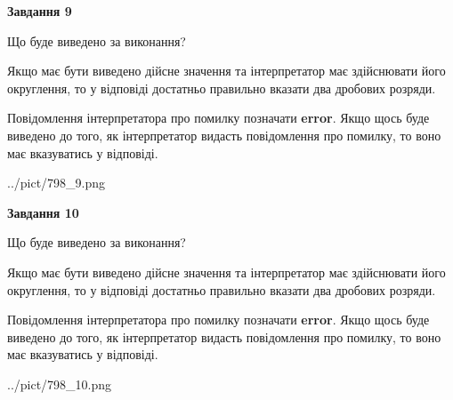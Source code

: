 \documentclass[12pt, ukrainian]{article}
\begin{document}
{\begin {Large}
{\begin {center}\textbf{Завдання 9}\end {center}}\par
Що буде виведено за виконання? \par

Якщо має бути виведено дійсне значення та інтерпретатор має здійснювати його округлення, 
то у відповіді достатньо правильно вказати два дробових розряди.

Повідомлення інтерпретатора про помилку позначати \textbf{error}.
Якщо щось буде виведено до того, як інтерпретатор видасть повідомлення про помилку, 
то воно має вказуватись у відповіді. \par

\begin{center}
	{../pict/798_9.png}
\end{center}
\newpage

{\begin {center}\textbf{Завдання 10}\end {center}}\par
Що буде виведено за виконання? \par

Якщо має бути виведено дійсне значення та інтерпретатор має здійснювати його округлення, 
то у відповіді достатньо правильно вказати два дробових розряди.

Повідомлення інтерпретатора про помилку позначати \textbf{error}.
Якщо щось буде виведено до того, як інтерпретатор видасть повідомлення про помилку, 
то воно має вказуватись у відповіді. \par

\begin{center}
	{../pict/798_10.png}
\end{center}
\newpage

\end {Large}}
\end{document}
